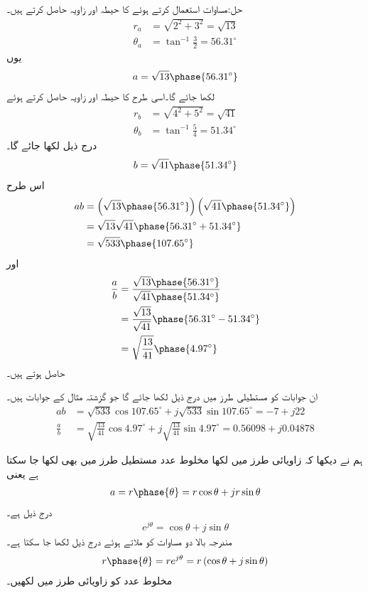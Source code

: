 حل:مساوات  استعمال کرتے ہوئے  کا حیطہ اور زاویہ حاصل کرتے ہیں۔
\begin{align*}
r_a&=\sqrt{2^2+3^2}=\sqrt{13}\\
\theta_a&=\tan^{-1}\frac{3}{2}=56.31^{\circ}
\end{align*}
یوں
\begin{align*}
a=\sqrt{13}\phase{56.31^{\circ}}
\end{align*}
لکھا جائے گا۔اسی طرح  کا حیطہ اور زاویہ حاصل کرتے ہوئے
\begin{align*}
r_b&=\sqrt{4^2+5^2}=\sqrt{41}\\
\theta_b&=\tan^{-1}\frac{5}{4}=51.34^{\circ}
\end{align*}
درج ذیل لکھا جائے گا۔
\begin{align*}
b=\sqrt{41}\phase{51.34^{\circ}}
\end{align*}
اس طرح
\begin{align*}
ab&=\left(\sqrt{13}\phase{56.31^{\circ}}\right)\left(\sqrt{41}\phase{51.34^{\circ}}\right)\\
&=\sqrt{13}\sqrt{41}\phase{56.31^{\circ}+51.34^{\circ}}\\
&=\sqrt{533}\phase{107.65^{\circ}}
\end{align*}
اور
\begin{align*}
\frac{a}{b}&=\frac{\sqrt{13}\phase{56.31^{\circ}}}{\sqrt{41}\phase{51.34^{\circ}}}\\
&=\frac{\sqrt{13}}{\sqrt{41}}\phase{56.31^{\circ}-51.34^{\circ}}\\
&=\sqrt{\frac{13}{41}}\phase{4.97^{\circ}}
\end{align*}
حاصل ہوتے ہیں۔

ان جوابات کو مستطیلی طرز میں درج ذیل لکھا جائے گا جو گزشتہ مثال کے جوابات ہیں۔
\begin{align*}
ab&=\sqrt{533} \cos 107.65^{\circ}+j \sqrt{533}\sin{107.65^{\circ}}=-7+j22\\
\frac{a}{b}&=\sqrt{\frac{13}{41}} \cos 4.97^{\circ}+j\sqrt{\frac{13}{41}}\sin 4.97^{\circ}=0.56098+j0.04878
\end{align*}

ہم نے دیکھا کہ زاویائی طرز میں لکھا مخلوط عدد   مستطیل طرز میں بھی لکھا جا سکتا ہے یعنی
\begin{align}
a=r\phase{\theta}=r \cos \theta +j r \sin \theta
\end{align}
 درج ذیل ہے۔
\begin{align}
e^{j \theta}=\cos \theta+j \sin \theta
\end{align}
مندرجہ بالا دو مساوات کو ملاتے ہوئے درج ذیل لکھا جا سکتا ہے۔
\begin{align}\label{مساوات_بدلتا_مخلوط_عدد_طرز_لکھائی}
r\phase{\theta}=r e^{j\theta}=r\left(\cos \theta+j  \sin \theta\right)
\end{align}
مخلوط عدد  کو زاویائی طرز میں لکھیں۔

